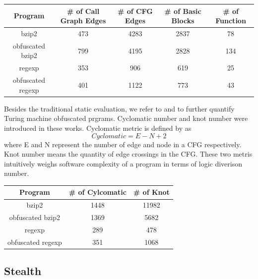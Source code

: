 \documentclass[lnicst]{svmultln}
\begin{document}
\begin{center}
 \begin{tabular}{|c | c | c | c | c|} 
 \hline 
 Program & \# of Call Graph Edges & \# of CFG Edges & \# of Basic Blocks & \# of Function \\
 \hline
bzip2 & 473 & 4283 & 2837 & 78 \\ 
 \hline
obfuscated bzip2 & 799 & 4195 & 2828 & 134 \\
 \hline
regexp & 353 & 906 & 619 & 25 \\ 
 \hline
obfuscated regexp & 401 & 1122 & 773 & 43 \\
 \hline
\end{tabular}
\end{center}

Besides the traditional static evaluation, we refer to \cite{McCabe} and \cite{Woodward} to further quantify Turing machine obfuscated prgrams. Cyclomatic number and knot number were introduced in these works. Cyclomatic metric is defined by as \[ Cyclomatic = E - N + 2 \] where E and N represent the number of edge and node in a CFG respectively. Knot number means the quantity of edge crossings in the CFG. These two metris intuitively weighs software complexity of a program in terms of logic diverison number.

\begin{center}
 \begin{tabular}{|c | c | c |} 
 \hline 
 Program & \# of Cylcomatic & \# of Knot \\
 \hline
bzip2 & 1448 & 11982  \\ 
 \hline
obfuscated bzip2 & 1369 & 5682  \\
 \hline
regexp & 289 & 478 \\ 
 \hline
obfuscated regexp & 351 & 1068 \\
 \hline
\end{tabular}
\end{center}
\subsection{Stealth}
\end{document}
